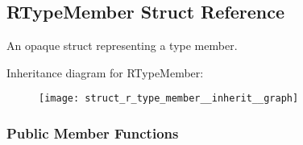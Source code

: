 \hypertarget{struct_r_type_member}{\subsection{R\-Type\-Member Struct Reference}
\label{struct_r_type_member}
}


An opaque struct representing a type member.  




Inheritance diagram for R\-Type\-Member\-:\nopagebreak
\begin{figure}[H]
\begin{center}
\leavevmode
\texttt{[image: struct\_r\_type\_member\_\_inherit\_\_graph]}
\end{center}
\end{figure}
\subsubsection*{Public Member Functions}
